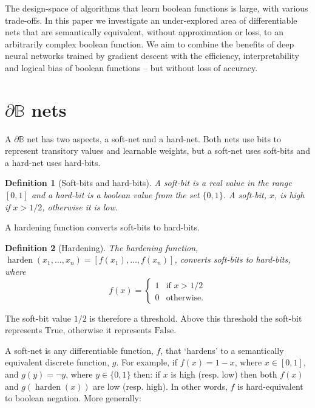 \documentclass{article} %
\newtheorem*{definition}{Definition}
\begin{document}
The design-space of algorithms that learn boolean functions is large, with various trade-offs. In this paper we investigate an under-explored area of differentiable nets that are semantically equivalent, without approximation or loss, to an arbitrarily complex boolean function. We aim to combine the benefits of deep neural networks trained by gradient descent with the efficiency, interpretability and logical bias of boolean functions -- but without loss of accuracy.

\section{$\partial\mathbb{B}$ nets}\label{sec:db-nets}

A $\partial \mathbb{B}$ net has two aspects, a soft-net and a hard-net. Both nets use bits to represent transitory values and learnable weights, but a soft-net uses soft-bits and a hard-net uses hard-bits.

\begin{definition}[Soft-bits and hard-bits]
A {\em soft-bit} is a real value in the range $[0,1]$ and a {\em hard-bit} is a boolean value from the set $\{0,1\}$. A soft-bit, $x$, is {\em high} if $x>1/2$, otherwise it is {\em low}.
\end{definition}

A hardening function converts soft-bits to hard-bits.

\begin{definition}[Hardening]
The {\em hardening} function, $\operatorname{harden}(x_{1}, \dots, x_{n}) = [f(x_{1}), \dots, f(x_{n})]$, converts soft-bits to hard-bits, where
\begin{equation*}
f(x) =
\begin{cases}
1 & \text{if } x > 1/2 \\
0 & \text{otherwise.}
\end{cases}
\end{equation*}
\end{definition}

The soft-bit value $1/2$ is therefore a threshold. Above this threshold the soft-bit represents $\text{True}$, otherwise it represents $\text{False}$.

A soft-net is any differentiable function, $f$, that `hardens' to a semantically equivalent discrete function, $g$. For example, if $f(x) = 1 - x$, where $x \in [0,1]$, and $g(y) = \neg y$, where $y \in \{0,1\}$ then: if $x$ is high (resp. low) then both $f(x)$ and $g(\operatorname{harden}(x))$ are low (resp. high). In other words, $f$ is hard-equivalent to boolean negation. More generally:
\end{document}
